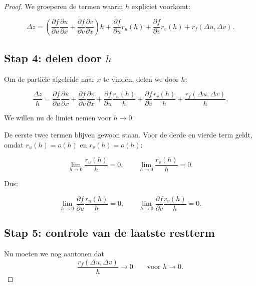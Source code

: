 \documentclass[11pt,a4paper]{article}
\begin{document}
\begin{proof}
        We groeperen de termen waarin $h$ expliciet voorkomt:

        \[
            \Delta z
            =
            \left(
                \frac{\partial f}{\partial u}\frac{\partial u}{\partial x}
                +
                \frac{\partial f}{\partial v}\frac{\partial v}{\partial x}
            \right)h
            +
            \frac{\partial f}{\partial u}r_u(h)
            +
            \frac{\partial f}{\partial v}r_v(h)
            +
            r_f(\Delta u,\Delta v).
        \]

        \subsection*{Stap 4: delen door $h$}

        Om de partiële afgeleide naar $x$ te vinden, delen we door $h$:

        \[
            \frac{\Delta z}{h}
            =
            \frac{\partial f}{\partial u}\frac{\partial u}{\partial x}
            +
            \frac{\partial f}{\partial v}\frac{\partial v}{\partial x}
            +
            \frac{\partial f}{\partial u}\frac{r_u(h)}{h}
            +
            \frac{\partial f}{\partial v}\frac{r_v(h)}{h}
            +
            \frac{r_f(\Delta u,\Delta v)}{h}.
        \]

        We willen nu de limiet nemen voor $h\to0$.

        De eerste twee termen blijven gewoon staan. Voor de derde en vierde term geldt,
        omdat $r_u(h)=o(h)$ en $r_v(h)=o(h)$:

        \[
            \lim_{h\to0}\frac{r_u(h)}{h}=0,
            \qquad
            \lim_{h\to0}\frac{r_v(h)}{h}=0.
        \]

        Dus:

        \[
            \lim_{h\to0}
            \frac{\partial f}{\partial u}\frac{r_u(h)}{h}
            =0,
            \qquad
            \lim_{h\to0}
            \frac{\partial f}{\partial v}\frac{r_v(h)}{h}
            =0.
        \]

        \subsection*{Stap 5: controle van de laatste restterm}

        Nu moeten we nog aantonen dat
        \[
            \frac{r_f(\Delta u,\Delta v)}{h}\to0
            \qquad \text{voor } h\to0.
        \]


\end{proof}
\end{document}

